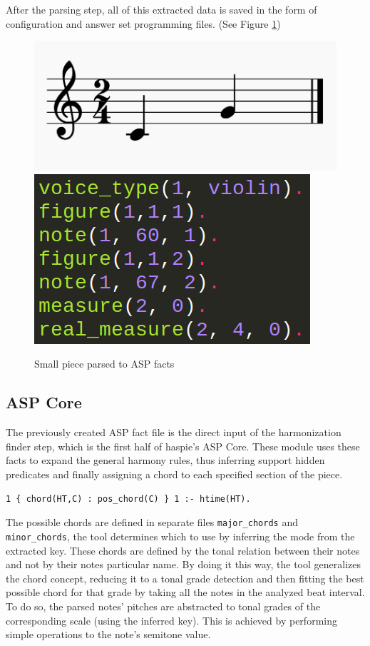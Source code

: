 After the parsing step, all of this extracted data is saved in the form of configuration and answer set programming files. (See Figure \ref{fig:simple-piece-facts})

\begin{figure}[h]
	\centering
	\includegraphics[width=0.4\linewidth]{imagenes/example_notes.png}
	\includegraphics[width=0.3\linewidth]{imagenes/logic_facts_score.png}
	\caption{Small piece parsed to ASP facts}
	\label{fig:simple-piece-facts}
\end{figure}

\subsection{ASP Core}
The previously created ASP fact file is the direct input of the harmonization finder step, which is the first half of haspie's ASP Core.
These module uses these facts to expand the general harmony rules, thus inferring support hidden predicates and finally assigning a chord to each specified section of the piece.

\begin{Verbatim}[frame=single]
1 { chord(HT,C) : pos_chord(C) } 1 :- htime(HT).
\end{Verbatim}

The possible chords are defined in separate files \texttt{major\_chords} and \texttt{minor\_chords}, the tool determines which to use by inferring the mode from the extracted key. These chords are defined by the tonal relation between their notes and not by their notes particular name. By doing it this way, the tool generalizes the chord concept, reducing it to a tonal grade detection and then fitting the best possible chord for that grade by taking all the notes in the analyzed beat interval. To do so, the parsed notes' pitches are abstracted to tonal grades of the corresponding scale (using the inferred key). This is achieved by performing simple operations to the note's semitone value.

